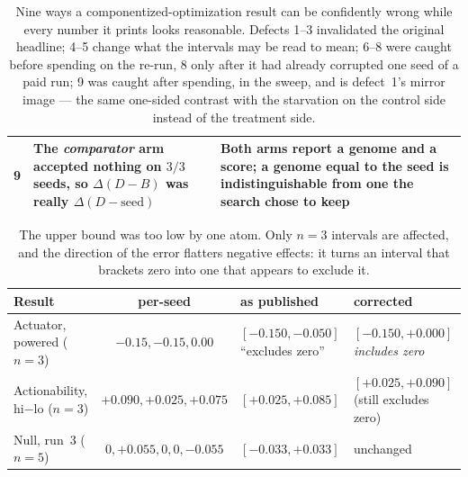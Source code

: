 \documentclass[11pt]{article}
\newcommand{\dd}{\ensuremath{\Delta}}
\begin{document}
\begin{table}[h]
\begin{tabular}{p{}p{}p{}}
9 & The \emph{comparator} arm accepted nothing on $3/3$ seeds, so $\dd(D-B)$ was really
  $\dd(D-\mathrm{seed})$ & Both arms report a genome and a score; a genome equal to the seed is
  indistinguishable from one the search chose to keep \\
\bottomrule
\end{tabular}
\caption{Nine ways a componentized-optimization result can be confidently wrong while every
number it prints looks reasonable. Defects 1--3 invalidated the original headline; 4--5 change
what the intervals may be read to mean; 6--8 were caught before spending on the re-run, 8 only
after it had already corrupted one seed of a paid run; 9 was caught after spending, in the
sweep, and is defect~1's mirror image --- the same one-sided contrast with the starvation on the
control side instead of the treatment side.}
\label{tab:defects}
\end{table}

\begin{table}[h]
\centering
\small
\setlength{\tabcolsep}{5pt}
\begin{tabular}{lcp{}p{}}
\toprule
Result & per-seed & as published & corrected \\
\midrule
Actuator, powered ($n{=}3$) & $-0.15, -0.15, 0.00$ & $[-0.150,-0.050]$ ``excludes zero''
  & $\mathbf{[-0.150,+0.000]}$ \emph{includes zero} \\
Actionability, hi$-$lo ($n{=}3$) & $+0.090, +0.025, +0.075$ & $[+0.025,+0.085]$
  & $[+0.025,+0.090]$ (still excludes zero) \\
Null, run~3 ($n{=}5$) & $0,+0.055,0,0,-0.055$ & $[-0.033,+0.033]$ & unchanged \\
\bottomrule
\end{tabular}
\caption{The upper bound was too low by one atom. Only $n{=}3$ intervals are affected, and
the direction of the error flatters negative effects: it turns an interval that brackets
zero into one that appears to exclude it.}
\label{tab:ciexcl}
\end{table}
\end{document}

